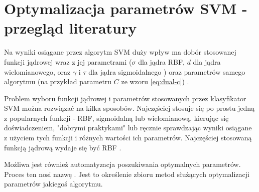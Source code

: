 \section{Optymalizacja parametrów SVM - przegląd literatury}
Na wyniki osiągane przez algorytm SVM duży wpływ ma dobór stosowanej funkcji jądrowej wraz z jej parametrami ($ \sigma $ dla jądra RBF, $ d $ dla jądra wielomianowego, oraz $ \gamma $ i $ \tau $ dla jądra sigmoidalnego ) oraz parametrów samego algorytmu (na przykład parametru $ C $ ze wzoru \ref{eq:dual-c}) \cite{practical_2003}. 

Problem wyboru funkcji jądrowej i parametrów stosowanych przez klasyfikator SVM można rozwiązać na kilka sposobów. Najczęściej stosuje się po prostu jedną z popularnych funkcji - RBF, sigmoidalną lub wielomianową, kierując się doświadczeniem, "dobrymi praktykami" lub ręcznie sprawdzając wyniki osiągane z użyciem tych funkcji i różnych wartości ich parametrów. Najczęściej stosowaną funkcją jądrową wydaje się być RBF \cite{practical_2003} \cite{howley_genetic_2005}.

Możliwa jest również automatyzacja poszukiwania optymalnych parametrów. Proces ten nosi nazwę . Jest to określenie zbioru metod służących optymalizacji parametrów jakiegoś algorytmu.

